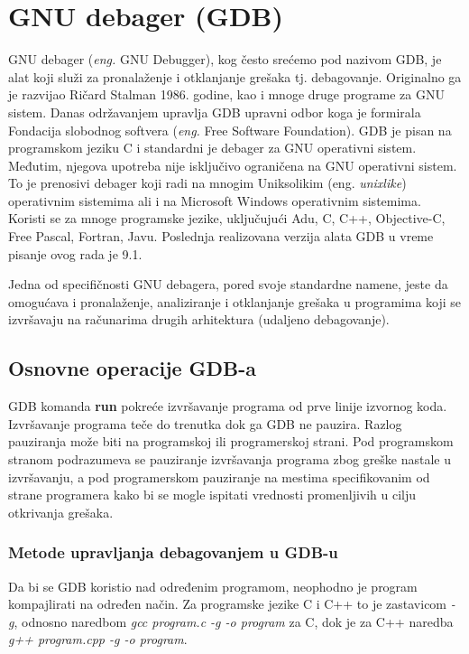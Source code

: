 \documentclass[a4paper]{article}
\begin{document}
\section{GNU debager (GDB)}
\label{sec:GDB}
GNU debager (\textit{eng.} GNU Debugger), kog često srećemo pod nazivom GDB, je alat koji služi za pronalaženje 
i otklanjanje grešaka tj. debagovanje. Originalno ga je razvijao Ričard Stalman 1986. godine, kao i mnoge druge programe 
za GNU sistem\cite{gdb}. Danas održavanjem upravlja GDB upravni odbor koga je formirala Fondacija 
slobodnog softvera (\textit{eng.} Free Software Foundation).
GDB je pisan na programskom jeziku C i standardni je debager za GNU operativni sistem. 
Međutim, njegova upotreba nije isključivo ograničena na GNU operativni sistem. To je prenosivi debager
koji radi na mnogim Uniksolikim (eng. \textit{unixlike}) operativnim sistemima ali i na Microsoft Windows operativnim 
sistemima. Koristi se za mnoge programske jezike, uključujući
Adu, C, C++, Objective-C, Free Pascal, Fortran, Javu.
Poslednja realizovana verzija alata GDB u vreme pisanje ovog rada je 9.1\cite{sourceware}. 

Jedna od specifičnosti GNU debagera, pored svoje standardne namene, jeste da omogućava i 
pronalaženje, analiziranje i otklanjanje grešaka u programima koji se izvršavaju na računarima drugih 
arhitektura (udaljeno debagovanje)\cite{master_rad}.

\subsection{Osnovne operacije GDB-a}
\label{subsec:debager_operacije}

GDB komanda \textbf{run} pokreće izvršavanje programa od prve linije izvornog koda.
Izvršavanje programa teče do trenutka dok ga GDB ne pauzira. 
Razlog pauziranja može biti na programskoj ili programerskoj strani.
Pod programskom stranom podrazumeva se pauziranje
izvršavanja programa zbog greške nastale u izvršavanju, a pod programerskom
pauziranje na mestima specifikovanim od strane programera kako bi se mogle ispitati
vrednosti promenljivih u cilju otkrivanja grešaka.

\subsubsection{Metode upravljanja debagovanjem u GDB-u}
\label{subsec:gdb_metode}

Da bi se GDB koristio nad određenim programom, neophodno je program kompajlirati 
na određen način. Za programske jezike C i C++ to je zastavicom \textit{-g}, odnosno naredbom
\textit{gcc program.c -g -o program} za C, dok je za C++ naredba \textit{g++ program.cpp -g -o program}.
\end{document}
